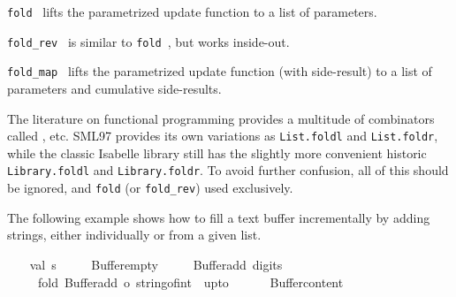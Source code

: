 \begin{isabellebody}
\begin{isamarkuptext}
  \begin{description}

  \item \verb|fold|~ lifts the parametrized update function
   to a list of parameters.

  \item \verb|fold_rev|~ is similar to \verb|fold|~, but works inside-out.

  \item \verb|fold_map|~ lifts the parametrized update
  function  (with side-result) to a list of parameters and
  cumulative side-results.

  \end{description}

  \begin{warn}
  The literature on functional programming provides a multitude of
  combinators called ,  etc.  SML97
  provides its own variations as \verb|List.foldl| and \verb|List.foldr|, while the classic Isabelle library still has the
  slightly more convenient historic \verb|Library.foldl| and \verb|Library.foldr|.  To avoid further confusion, all of this should be
  ignored, and \verb|fold| (or \verb|fold_rev|) used exclusively.
  \end{warn}%
\end{isamarkuptext}%
\isamarkuptrue%
%
\endisatagmlref
{\isafoldmlref}%
%
\isadelimmlref
%
\endisadelimmlref
%
\isadelimmlex
%
\endisadelimmlex
%
\isatagmlex
%
\begin{isamarkuptext}%
The following example shows how to fill a text buffer
  incrementally by adding strings, either individually or from a given
  list.%
\end{isamarkuptext}%
\isamarkuptrue%
%
\endisatagmlex
{\isafoldmlex}%
%
\isadelimmlex
%
\endisadelimmlex
%
\isadelimML
%
\endisadelimML
%
\isatagML
{}\isamarkupfalse%
\ {\isacharverbatimopen}\isanewline
\ \ val\ s\ {\isacharequal}\isanewline
\ \ \ \ Buffer{\isachardot}empty\isanewline
\ \ \ \ {\isacharbar}{\isachargreater}\ Buffer{\isachardot}add\ {\isachardoublequote}digits{\isacharcolon}\ {\isachardoublequote}\isanewline
\ \ \ \ {\isacharbar}{\isachargreater}\ fold\ {\isacharparenleft}Buffer{\isachardot}add\ o\ string{\isacharunderscore}of{\isacharunderscore}int{\isacharparenright}\ {\isacharparenleft}{}\ upto\ {}{\isacharparenright}\isanewline
\ \ \ \ {\isacharbar}{\isachargreater}\ Buffer{\isachardot}content{\isacharsemicolon}\isanewline
\isanewline
\ \ %
\isaantiq

\end{isabellebody}
